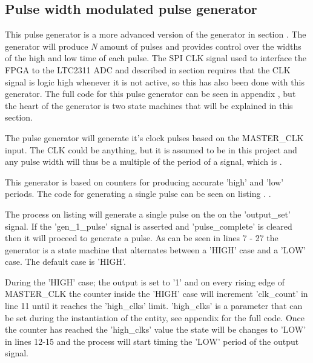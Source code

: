 \subsection{Pulse width modulated pulse generator} \label{subsec:PWMGen} 

This pulse generator is a more advanced version of the generator in section . The generator will produce \textit{N} amount of pulses and provides control over the widths of the high and low time of each pulse. The SPI CLK signal used to interface the FPGA to the LTC2311 ADC and described in section  requires that the CLK signal is logic high whenever it is not active, so this has also been done with this generator.
The full code for this pulse generator can be seen in appendix , but the heart of the generator is two state machines that will be explained in this section.

The pulse generator will generate it's clock pulses based on the MASTER\_CLK input. The CLK could be anything, but it is assumed to be  in this project and any pulse width will thus be a multiple of the period of a  signal, which is .

This generator is based on counters for producing accurate 'high' and 'low' periods. The code for generating a single pulse can be seen on listing .
. 

The process on listing  will generate a single pulse on the on the 'output\_set' signal. If the 'gen\_1\_pulse' signal is asserted and 'pulse\_complete' is cleared then it will proceed to generate a pulse. As can be seen in lines 7 - 27 the generator is a state machine that alternates between a 'HIGH' case and a 'LOW' case. The default case is 'HIGH'.

During the 'HIGH' case; the output is set to '1' and on every rising edge of MASTER\_CLK the counter inside the 'HIGH' case will increment 'clk\_count' in line 11 until it reaches the 'high\_clks' limit. 'high\_clks' is a parameter that can be set during the instantiation of the entity, see appendix  for the full code. Once the counter has reached the 'high\_clks' value the state will be changes to 'LOW' in lines 12-15 and the process will start timing the 'LOW' period of the output signal.


